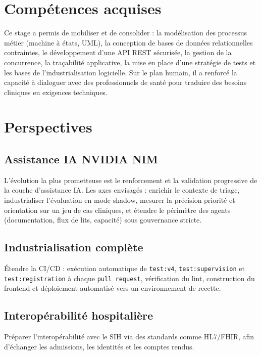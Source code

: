 \section{Compétences acquises}

Ce stage a permis de mobiliser et de consolider : la modélisation des processus métier (machine à états, UML), la conception de bases de données relationnelles contraintes, le développement d'une API REST sécurisée, la gestion de la concurrence, la traçabilité applicative, la mise en place d'une stratégie de tests et les bases de l'industrialisation logicielle. Sur le plan humain, il a renforcé la capacité à dialoguer avec des professionnels de santé pour traduire des besoins cliniques en exigences techniques.

\section{Perspectives}

\subsection{Assistance IA NVIDIA NIM}

L'évolution la plus prometteuse est le renforcement et la validation progressive de la couche d'assistance IA. Les axes envisagés : enrichir le contexte de triage, industrialiser l'évaluation en mode shadow, mesurer la précision priorité et orientation sur un jeu de cas cliniques, et étendre le périmètre des agents (documentation, flux de lits, capacité) sous gouvernance stricte.

\subsection{Industrialisation complète}

Étendre la CI/CD : exécution automatique de \texttt{test:v4}, \texttt{test:supervision} et \texttt{test:registration} à chaque \texttt{pull request}, vérification du lint, construction du frontend et déploiement automatisé vers un environnement de recette.

\subsection{Interopérabilité hospitalière}

Préparer l'interopérabilité avec le SIH via des standards comme HL7/FHIR, afin d'échanger les admissions, les identités et les comptes rendus.


